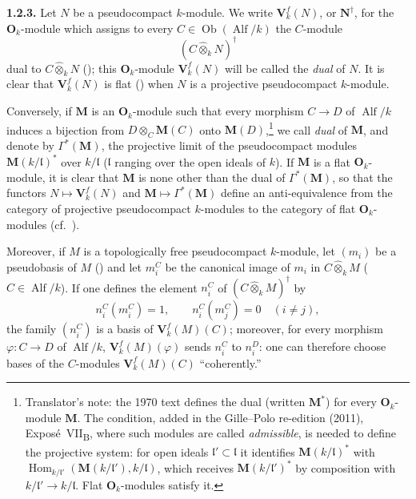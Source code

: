 
\medskip
\noindent\textbf{1.2.3.}
\label{sga3:VIIB:1.2.3}
\label{sga3:VIIB:1.2.3.B}%
Let \(N\) be a pseudocompact \(k\)-module. We write
\(\mathbf V_k^f(N)\), or \(\mathbf N^\dagger\), for the
\(\mathbf O_k\)-module which assigns to every
\(C\in\operatorname{Ob}(\operatorname{Alf}/k)\) the \(C\)-module
\[
  (C\widehat{\otimes}_kN)^\dagger
\]
dual to \(C\widehat{\otimes}_kN\) (); this
\(\mathbf O_k\)-module \(\mathbf V_k^f(N)\) will be called the
\emph{dual} of \(N\). It is clear that \(\mathbf V_k^f(N)\) is flat
() when \(N\) is a projective pseudocompact \(k\)-module.

\label{sga3:VIIB:1.2.3.D}%
Conversely, if \(\mathbf M\) is an \(\mathbf O_k\)-module such that every
morphism \(C\to D\) of \(\operatorname{Alf}/k\) induces a bijection from
\(D\otimes_C\mathbf M(C)\) onto \(\mathbf M(D)\),\footnote{Translator's note: the 1970 text defines the
dual (written \(\mathbf M^*\)) for every \(\mathbf O_k\)-module \(\mathbf M\). The condition, added in the
Gille--Polo re-edition (2011), Expos\'e~VII\textsubscript{B}, where such modules are called
\emph{admissible}, is needed to define the projective system: for open ideals
\(\mathfrak l'\subset\mathfrak l\) it identifies \(\mathbf M(k/\mathfrak l)^*\) with
\(\operatorname{Hom}_{k/\mathfrak l'}(\mathbf M(k/\mathfrak l'),k/\mathfrak l)\), which receives
\(\mathbf M(k/\mathfrak l')^*\) by composition with \(k/\mathfrak l'\to k/\mathfrak l\). Flat
\(\mathbf O_k\)-modules satisfy it.} we call \emph{dual} of \(\mathbf M\),
and denote by \(\Gamma^*(\mathbf M)\), the projective limit of the
pseudocompact modules \(\mathbf M(k/\mathfrak l)^*\) over
\(k/\mathfrak l\) (\(\mathfrak l\) ranging over the open ideals of \(k\)).
\label{sga3:VIIB:1.2.3.E}%
If \(\mathbf M\) is a flat \(\mathbf O_k\)-module, it is clear that
\(\mathbf M\) is none other than the dual of \(\Gamma^*(\mathbf M)\), so
that the functors \(N\mapsto\mathbf V_k^f(N)\) and
\(\mathbf M\mapsto\Gamma^*(\mathbf M)\) define an anti-equivalence from
the category of projective pseudocompact \(k\)-modules to the category of
flat \(\mathbf O_k\)-modules (cf.\ ).

\label{sga3:VIIB:1.2.3.F}%
Moreover, if \(M\) is a topologically free pseudocompact \(k\)-module,
let \((m_i)\) be a pseudobasis of \(M\) () and let \(m_i^C\) be
the canonical image of \(m_i\) in \(C\widehat{\otimes}_kM\)
(\(C\in\operatorname{Alf}/k\)). If one defines the element \(n_i^C\) of
\((C\widehat{\otimes}_kM)^\dagger\) by
\[
  n_i^C(m_i^C)=1,
  \qquad
  n_i^C(m_j^C)=0\quad(i\ne j),
\]
the family \((n_i^C)\) is a basis of \(\mathbf V_k^f(M)(C)\); moreover,
for every morphism \(\varphi:C\to D\) of \(\operatorname{Alf}/k\),
\(\mathbf V_k^f(M)(\varphi)\) sends \(n_i^C\) to \(n_i^D\): one can
therefore choose bases of the \(C\)-modules \(\mathbf V_k^f(M)(C)\)
``coherently.''


